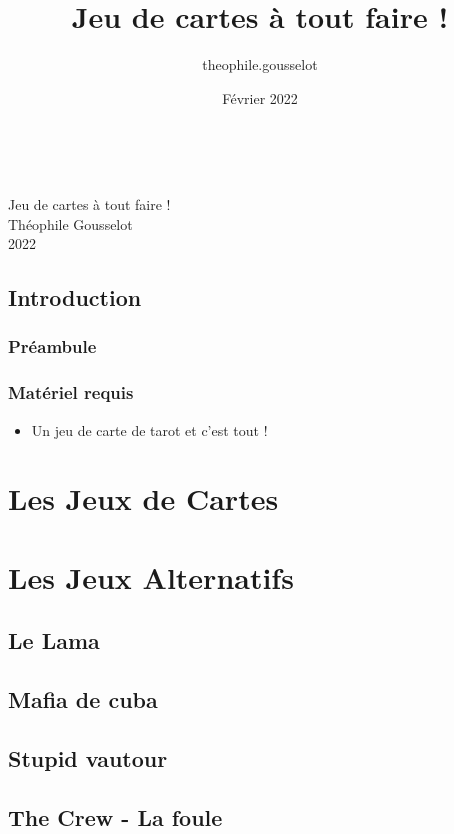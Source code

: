 \documentclass{book}
\title{Jeu de cartes à tout faire !}
\author{theophile.gousselot }
\date{Février 2022}
\begin{document}
\tt
\begin{center}


\huge Jeu de cartes à tout faire ! \\


\Large Théophile Gousselot\\
2022
\end{center}


\tableofcontents

\newpage

\section*{Introduction}
\subsection*{Préambule}

\subsection*{Matériel requis}
\begin{itemize}
    \item Un jeu de carte de tarot et c'est tout !
\end{itemize}


 
\chapter{Les Jeux de Cartes}
\minitoc


\newpage
\chapter{Les Jeux Alternatifs}
\minitoc

\newpage
\section{Le Lama}
\section{Mafia de cuba}
\section{Stupid vautour}
\section{The Crew - La foule}
\end{document}
